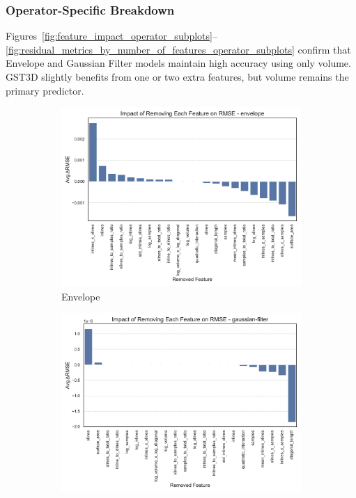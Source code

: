 \subsubsection{Operator-Specific Breakdown}
\label{subsec:operator-specific-breakdown}

Figures~\ref{fig:feature_impact_operator_subplots}--\ref{fig:residual_metrics_by_number_of_features_operator_subplots} confirm that Envelope and Gaussian Filter models maintain high accuracy using only volume.
\ac{GST3D} slightly benefits from one or two extra features, but volume remains the primary predictor.

\begin{figure}[htbp]
    \centering
    \begin{subfigure}[t]{0.32\textwidth}
        \includegraphics[width=\textwidth]{assets/images/05/feature_impact_envelope}
        \caption{Envelope}
    \end{subfigure}
    \hfill
    \begin{subfigure}[t]{0.32\textwidth}
        \includegraphics[width=\textwidth]{assets/images/05/feature_impact_gaussian-filter}

\end{subfigure}
\end{figure}

